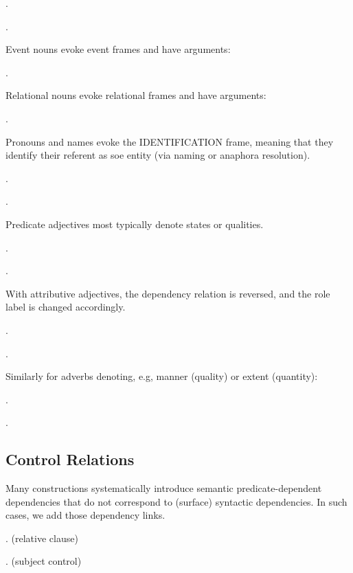 \documentclass[a4paper]{article}
\newcommand{\fr}[1]{\textsf{#1}}
\newcommand{\rl}[1]{\textsf{#1}}
\begin{document}
\ex.

\ex.

Event nouns evoke event frames and have arguments:

\ex.

Relational nouns evoke relational frames and have arguments:

\ex.

Pronouns and names evoke the \fr{IDENTIFICATION} frame, meaning that they
identify their referent as soe entity (via naming or anaphora resolution).

\ex.

\ex.

Predicate adjectives most typically denote states or qualities.

\ex.

\ex.

With attributive adjectives, the dependency relation is reversed, and the role label is changed accordingly.

\ex.

\ex.

Similarly for adverbs denoting, e.g, manner (\rl{quality}) or extent (\rl{quantity}):

\ex.

\ex.

\subsection{Control Relations}
\label{sec:control}


Many constructions systematically introduce semantic predicate-dependent
dependencies that do not correspond to (surface) syntactic dependencies. In such cases, we add those dependency links.

\ex. (relative clause)

\ex. (subject control)
\end{document}
